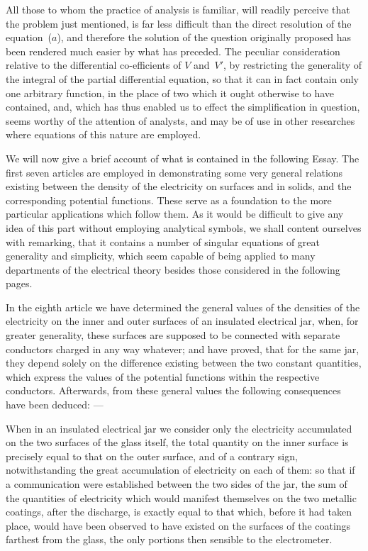 \documentclass[11pt,notitlepage]{amsart}
\begin{document}
All those to whom the practice of analysis is familiar, will readily perceive
that the problem just mentioned,
is far less difficult than the direct resolution
of the equation~($a$),
and therefore the solution of the question originally proposed
has been rendered much easier by what has preceded. The peculiar
consideration relative to the differential co-efficients
of $V$ and~$V'$, by restricting
the generality of the integral of the partial differential equation,
so that it can
in fact contain only one arbitrary function,
in the place of two which it ought
otherwise to have contained, and, which has thus enabled us to effect the
simplification in question, seems worthy of the attention of analysts, and may
be of use in other researches where equations of this nature are employed.

We will now give a brief account of what is contained in the following
Essay. The first seven articles are employed in demonstrating some
very general relations existing between the density of the electricity on 
surfaces and in solids, and the corresponding potential functions. These serve
as a foundation to the more particular applications which follow them. As it
would be difficult to give any idea of this part without employing analytical
symbols, we shall content ourselves with remarking, that it contains a number
of singular equations of great generality and simplicity, which seem capable of
being applied to many departments of the electrical theory besides those 
considered in the following pages.

In the eighth article we have determined the general values of the
densities of the electricity on the inner and outer surfaces of an insulated
electrical jar, when, for greater generality, these surfaces are supposed to be
connected with separate conductors charged in any way whatever; and have
proved, that for the same jar, they depend solely on the difference existing
between the two constant quantities, which express the values of the potential
functions within the respective conductors. Afterwards, from these general
values the following consequences have been deduced: ---

When in an insulated electrical jar we consider only the electricity
accumulated on the two surfaces of the glass itself, the total quantity on the
inner surface is precisely equal to that on the outer surface, and of a contrary
sign, notwithstanding the great accumulation of electricity on each of them:
so that if a communication were established between the two sides of the jar,
the sum of the quantities of electricity which would manifest themselves on
the two metallic coatings, after the discharge, is exactly equal to that which,
before it had taken place, would have been observed to have existed on the
surfaces of the coatings farthest from the glass,
the only portions then sensible
to the electrometer.
\end{document}
